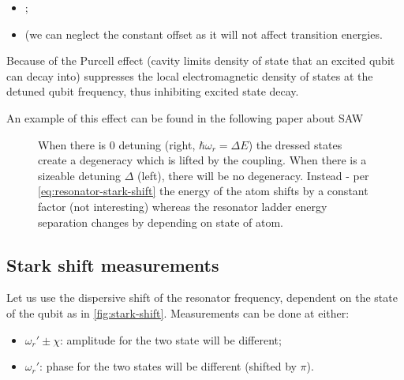  \begin{framed}\noindent
   \begin{itemize}
   \item  {};
   \item    {} (we can
     neglect the  constant offset as  it will
     not affect transition energies.
   \end{itemize}

   \noindent  Because of  the Purcell  effect
   (cavity  limits density  of state  that an
   excited qubit  can decay  into) suppresses
   the   local  electromagnetic   density  of
   states  at  the detuned  qubit  frequency,
   thus inhibiting excited state decay.
 \end{framed}

 \noindent An  example of this effect  can be
 found  in  the  following  paper  about  SAW
 \cite{Manenti_2017}

\begin{figure}[h]
  \centering
  \caption{\small  When there  is 0  detuning
    (right,  $\hbar\omega_{r}=\Delta E$)  the
    dressed states create  a degeneracy which
    is lifted by the  coupling. When there is
    a  sizeable   detuning  $\Delta$  (left),
    there will  be no degeneracy.   Instead -
    per    \autoref{eq:resonator-stark-shift}
    the  energy  of  the  atom  shifts  by  a
    constant factor (not interesting) whereas
    the  resonator  ladder energy  separation
    changes                                by
     depending on
    state                                  of
    atom. \label{fig:ac_stark_effect_dispersive_shift}}
\end{figure}

\newpage\subsection{Stark shift measurements}
\label{sec:stark-shift-meas}

Let  us  use  the  dispersive  shift  of  the
resonator frequency,  dependent on  the state
of the qubit as in \autoref{fig:stark-shift}.
Measurements can be done at either:
\begin{itemize}
\item $\omega_r'  \pm \chi $: amplitude  for the
  two state will be different;
\item $\omega_r'$:  phase for the  two states
  will be different (shifted by $\pi$).
\end{itemize}

